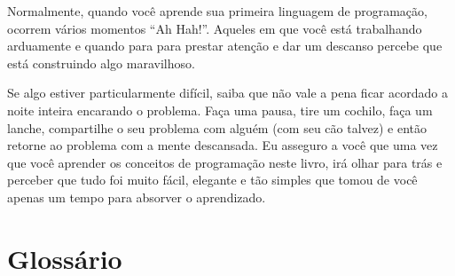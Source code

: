 Normalmente, quando você aprende sua primeira linguagem de programação, ocorrem
vários momentos ``Ah Hah!''. Aqueles em que você está trabalhando arduamente
e quando para para prestar atenção e dar um descanso percebe que está construindo
algo maravilhoso.
%

Se algo estiver particularmente difícil, saiba que não vale a pena ficar acordado
a noite inteira encarando o problema. Faça uma pausa, tire um cochilo, faça um lanche,
compartilhe o seu problema com alguém (com seu cão talvez) e então retorne ao
problema com a mente descansada. Eu asseguro a você que uma vez que você aprender
os conceitos de programação neste livro, irá olhar para trás e perceber que tudo foi
muito fácil, elegante e tão simples que tomou de você apenas um tempo para absorver
o aprendizado.
%

\section{Glossário}
%

